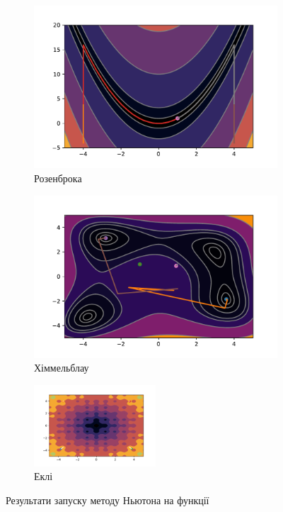 \begin{figure}[h!]
    \begin{subfigure}{0.5\textwidth}
        \includegraphics[width=\textwidth, trim=1.4cm 0.5cm 1.3cm 1cm, clip]{assets/Newton/rosenbrock.pdf}
        \caption{Розенброка}
    \end{subfigure}
    \begin{subfigure}{0.5\textwidth}
        \includegraphics[width=\textwidth, trim=1.4cm 0.5cm 1.3cm 1cm, clip]{assets/Newton/himmelblau.pdf}
        \caption{Хіммельблау}
    \end{subfigure}
    \begin{subfigure}{\textwidth}
        \centering
        \includegraphics[width=0.5\textwidth, trim=1.4cm 0.5cm 1.3cm 1cm, clip]{assets/Newton/ackley.pdf}
        \caption{Еклі}
    \end{subfigure}
    \caption{Результати запуску методу Ньютона на функції}
\end{figure}

